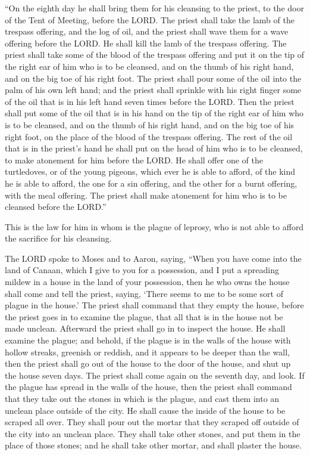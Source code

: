  ``On the eighth day he shall bring them for his cleansing
to the priest, to the door of the Tent of Meeting, before the LORD.
 The priest shall take the lamb of the trespass offering,
and the log of oil, and the priest shall wave them for a wave offering
before the LORD.  He shall kill the lamb of the trespass
offering. The priest shall take some of the blood of the trespass
offering and put it on the tip of the right ear of him who is to be
cleansed, and on the thumb of his right hand, and on the big toe of his
right foot.  The priest shall pour some of the oil into the
palm of his own left hand;  and the priest shall sprinkle
with his right finger some of the oil that is in his left hand seven
times before the LORD.  Then the priest shall put some of
the oil that is in his hand on the tip of the right ear of him who is to
be cleansed, and on the thumb of his right hand, and on the big toe of
his right foot, on the place of the blood of the trespass offering.
 The rest of the oil that is in the priest's hand he shall
put on the head of him who is to be cleansed, to make atonement for him
before the LORD.  He shall offer one of the turtledoves, or
of the young pigeons, which ever he is able to afford,  of
the kind he is able to afford, the one for a sin offering, and the other
for a burnt offering, with the meal offering. The priest shall make
atonement for him who is to be cleansed before the LORD.''

 This is the law for him in whom is the plague of leprosy,
who is not able to afford the sacrifice for his cleansing.

 The LORD spoke to Moses and to Aaron, saying,
 ``When you have come into the land of Canaan, which I give
to you for a possession, and I put a spreading mildew in a house in the
land of your possession,  then he who owns the house shall
come and tell the priest, saying, `There seems to me to be some sort of
plague in the house.'  The priest shall command that they
empty the house, before the priest goes in to examine the plague, that
all that is in the house not be made unclean. Afterward the priest shall
go in to inspect the house.  He shall examine the plague;
and behold, if the plague is in the walls of the house with hollow
streaks, greenish or reddish, and it appears to be deeper than the wall,
 then the priest shall go out of the house to the door of
the house, and shut up the house seven days.  The priest
shall come again on the seventh day, and look. If the plague has spread
in the walls of the house,  then the priest shall command
that they take out the stones in which is the plague, and cast them into
an unclean place outside of the city.  He shall cause the
inside of the house to be scraped all over. They shall pour out the
mortar that they scraped off outside of the city into an unclean place.
 They shall take other stones, and put them in the place of
those stones; and he shall take other mortar, and shall plaster the
house.

